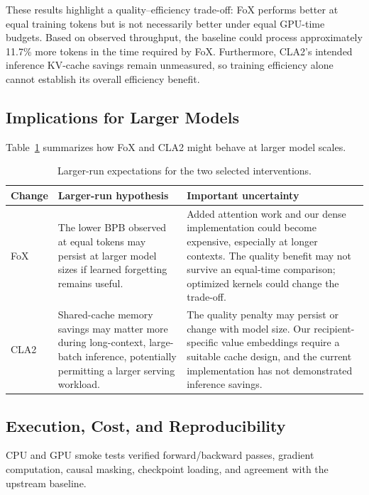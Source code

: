 \documentclass[11pt]{article}
\begin{document}
These results highlight a quality--efficiency trade-off:
FoX performs better at equal training tokens but is not
necessarily better under equal GPU-time budgets. Based
on observed throughput, the baseline could process
approximately 11.7\% more tokens in the time required
by FoX. Furthermore, CLA2's intended inference KV-cache
savings remain unmeasured, so training efficiency alone
cannot establish its overall efficiency benefit.



\subsection{Implications for Larger Models}
Table~\ref{tab:scaling-hypotheses} summarizes how FoX
and CLA2 might behave at larger model scales.

\begin{table}[htbp]
\centering
\small
\begin{tabularx}{\linewidth}{@{}p{1.2cm}XX@{}}
\hline
Change & Larger-run hypothesis & Important uncertainty\\
\hline
FoX & The lower BPB observed at equal tokens may persist at larger model
sizes if learned forgetting remains useful.
& Added attention work and our dense implementation could become expensive,
especially at longer contexts. The quality benefit may not survive an
equal-time comparison; optimized kernels could change the trade-off.\\
CLA2 & Shared-cache memory savings may matter more during long-context,
large-batch inference, potentially permitting a larger serving workload.
& The quality penalty may persist or change with model size. Our
recipient-specific value embeddings require a suitable cache design, and
the current implementation has not demonstrated inference savings.\\
\hline
\end{tabularx}
\caption{Larger-run expectations for the two selected interventions.}
\label{tab:scaling-hypotheses}
\end{table}

\subsection{Execution, Cost, and Reproducibility}

CPU and GPU smoke tests verified forward/backward passes,
gradient computation, causal masking, checkpoint loading,
and agreement with the upstream baseline.
\end{document}
